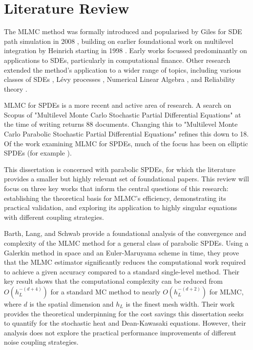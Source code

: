 \section{Literature Review}

The MLMC method was formally introduced and popularised by 
Giles for SDE path simulation in 2008 \cite{giles2008multilevel}, 
building on earlier foundational work on multilevel integration by 
Heinrich starting in 1998 \cite{heinrich1998monte}. Early works focussed 
predominantly on applications to SDEs, particularly in computational 
finance. Other research extended the method's application to a wider range 
of topics, including various classes of SDEs \cite{abdulle2013stabilized,
rhee2015unbiased}, Lévy processes \cite{giles2017multilevel}, 
Numerical Linear Algebra \cite{acebron2020probabilistic},
and Reliability theory \cite{aslett2017multilevel}.

MLMC for SPDEs is a more recent and active area of research. 
A search on Scopus \cite{scopus} of "Multilevel Monte Carlo Stochastic
Partial Differential Equations" at the time of writing returns 88 documents. Changing 
this to "Multilevel Monte Carlo Parabolic Stochastic Partial Differential Equations" refines 
this down to 18. Of the work examining MLMC for SPDEs, much of the focus has been on 
elliptic SPDEs (for example \cite{abdulle2013multilevel, kornhuber2014multilevel, luo2019multilevel}).

This dissertation is concerned with parabolic SPDEs, for which the literature 
provides a smaller but highly relevant set of foundational papers. This review will focus on 
three key works that inform the central questions of this research: establishing the theoretical 
basis for MLMC's efficiency, demonstrating its practical validation, and exploring 
its application to highly singular equations with different coupling strategies. 


Barth, Lang, and Schwab \cite{barth2013multilevel} provide a foundational 
analysis of the convergence and complexity of the MLMC method for a general class of 
parabolic SPDEs. Using a Galerkin method in space and an Euler-Maruyama scheme in time, they 
prove that the  MLMC estimator significantly reduces the computational work required 
to achieve a given accuracy compared to a standard single-level method. Their 
key result shows that the computational complexity can be reduced from $O(h_L^{-(d+4)})$
for a standard MC method to nearly $O(h_L^{-(d+2)})$ for MLMC, where $d$ is the 
spatial dimension and $h_L$ is the finest mesh width. Their work provides the
theoretical underpinning for the cost savings this dissertation seeks to quantify for 
the stochastic heat and Dean-Kawasaki equations. However, their analysis does not explore
the practical performance improvements of different noise coupling strategies.

